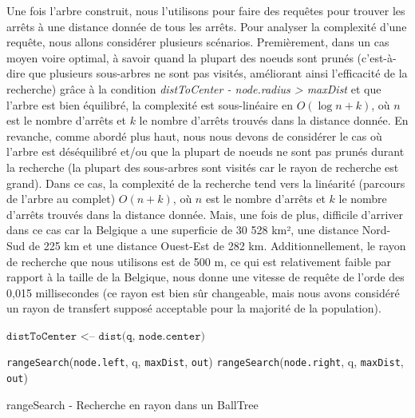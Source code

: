 \documentclass[12pt]{article}
\begin{document}
Une fois l'arbre construit, nous l'utilisons pour faire des requêtes pour trouver les arrêts à une distance donnée de tous les arrêts. Pour analyser la complexité d'une requête, nous allons considérer
plusieurs scénarios. Premièrement, dans un cas moyen voire optimal, à savoir quand la plupart des noeuds sont prunés (c'est-à-dire que plusieurs sous-arbres ne sont pas visités, améliorant ainsi l'efficacité
de la recherche) grâce à la condition \emph{distToCenter - node.radius > maxDist} et que l'arbre est bien équilibré, la complexité est sous-linéaire en $O(\log n + k)$, où $n$ est le nombre d'arrêts 
et $k$ le nombre d'arrêts trouvés dans la distance donnée. En revanche, comme abordé plus haut, nous nous devons de considérer le cas où l'arbre est déséquilibré et/ou que la plupart de noeuds ne sont 
pas prunés durant la recherche (la plupart des sous-arbres sont visités car le rayon de recherche est grand). Dans ce cas, la complexité de la recherche tend vers la linéarité (parcours de l'arbre au complet)
$O(n + k)$, où $n$ est le nombre d'arrêts et $k$ le nombre d'arrêts trouvés dans la distance donnée. Mais, une fois de plus, difficile d'arriver dans ce cas car la Belgique a une superficie de 30 528 km², une
distance Nord-Sud de 225 km et une distance Ouest-Est de 282 km. Additionnellement, le rayon de recherche que nous utilisons est de 500 m, ce qui est relativement faible par rapport à la taille de la Belgique,
nous donne une vitesse de requête de l'orde des 0,015 millisecondes (ce rayon est bien sûr changeable, mais nous avons considéré un rayon de transfert supposé acceptable pour la majorité de la population).

\begin{algorithm}[H]
    \footnotesize
    \DontPrintSemicolon
    
    
    $\texttt{distToCenter <-- dist(q, node.center)}$\;
    
    \texttt{rangeSearch}(\texttt{node.left}, q, \texttt{maxDist}, \texttt{out})\;
    \texttt{rangeSearch}(\texttt{node.right}, q, \texttt{maxDist}, \texttt{out})\;
\caption{rangeSearch - Recherche en rayon dans un BallTree}
\end{algorithm}
\end{document}
